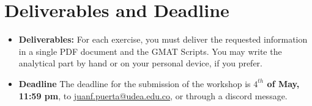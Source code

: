 \documentclass[11pt, letterpaper]{article}
\begin{document}
\section*{Deliverables and Deadline}
\begin{itemize}
    \item \textbf{Deliverables:} For each exercise, you must deliver the requested information in a single PDF document and the GMAT Scripts. You may write the analytical part by hand or on your personal device, if you prefer.
    \item \textbf{Deadline} The deadline for the submission of the workshop is \textbf{$4^{th}$ of May, 11:59 pm}, to \href{mailto:juanf.puerta@udea.edu.co}{juanf.puerta@udea.edu.co}, or through a discord message.
\end{itemize}
\end{document}
